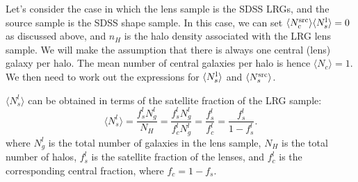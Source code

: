 \documentclass[onecolumn,amsmath,aps,fleqn, superscriptaddress]{revtex4}
\begin{document}
Let's consider the case in which the lens sample is the SDSS LRGs, and the source sample is the SDSS shape sample. In this case, we can set $\langle N_c^{\rm src}\rangle \langle N_s^{\rm l} \rangle=0$ as discussed above, and $n_H$ is the halo density associated with the LRG lens sample. We will make the assumption that there is always one central (lens) galaxy per halo. The mean number of central galaxies per halo is hence $\langle N_c \rangle=1$. We then need to work out the expressions for $\langle N_s^{\rm l} \rangle$ and $\langle N_s^{\rm src} \rangle$.

$\langle N_s^l \rangle$ can be obtained in terms of the satellite fraction of the LRG sample:
\begin{equation}
\langle N_s^l \rangle = \frac{f_s^l N_g^l}{N_H} = \frac{f_s^l N_g^l}{f_c^l N_g^l} = \frac{f_s^l}{f_c^l} = \frac{f_s^l}{1-f_s^l}.
\label{Nsmean_lens}
\end{equation}
where $N_g^l$ is the total number of galaxies in the lens sample, $N_H$ is the total number of halos, $f_s^l$ is the satellite fraction of the lenses, and $f_c^l$ is the corresponding central fraction, where $f_c=1-f_s$.
\end{document}
